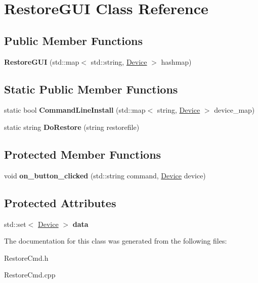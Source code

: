 \hypertarget{classRestoreGUI}{}\section{Restore\+G\+UI Class Reference}
\label{classRestoreGUI}
\subsection*{Public Member Functions}
\begin{DoxyCompactItemize}
\item 
\mbox{\label{classRestoreGUI_ab54fe7c54fd935a16087b8e3af3dfe64}} 
{\bfseries Restore\+G\+UI} (std\+::map$<$ std\+::string, \hyperlink{classDevice}{Device} $>$ hashmap)
\end{DoxyCompactItemize}
\subsection*{Static Public Member Functions}
\begin{DoxyCompactItemize}
\item 
\mbox{\label{classRestoreGUI_ac6b5762f54f83312872ca663890b8d66}} 
static bool {\bfseries Command\+Line\+Install} (std\+::map$<$ string, \hyperlink{classDevice}{Device} $>$ device\+\_\+map)
\item 
\mbox{\label{classRestoreGUI_a7cf25f915cd38767c2615bd385822fa4}} 
static string {\bfseries Do\+Restore} (string restorefile)
\end{DoxyCompactItemize}
\subsection*{Protected Member Functions}
\begin{DoxyCompactItemize}
\item 
\mbox{\label{classRestoreGUI_a51dfeb36a85cee02b2a644385a42597f}} 
void {\bfseries on\+\_\+button\+\_\+clicked} (std\+::string command, \hyperlink{classDevice}{Device} device)
\end{DoxyCompactItemize}
\subsection*{Protected Attributes}
\begin{DoxyCompactItemize}
\item 
\mbox{\label{classRestoreGUI_a051821a4af9951efe8afd792b6e5afe0}} 
std\+::set$<$ \hyperlink{classDevice}{Device} $>$ {\bfseries data}
\end{DoxyCompactItemize}


The documentation for this class was generated from the following files\+:\begin{DoxyCompactItemize}
\item 
Restore\+Cmd.\+h\item 
Restore\+Cmd.\+cpp\end{DoxyCompactItemize}
